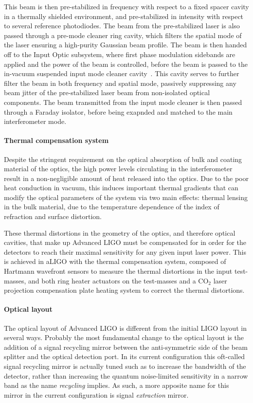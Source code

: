This beam is then pre-stabilized in frequency with respect to a fixed spacer cavity in a thermally shielded environment, and pre-stabilized in intensity with respect to several reference photodiodes. 
The beam from the pre-stabilized laser is also passed through a pre-mode cleaner ring cavity, which filters the spatial mode of the laser ensuring a high-purity Gaussian beam profile. 
The beam is then handed off to the Input Optic subsystem, where first phase modulation sidebands are applied and the power of the beam is controlled, before the beam is passed to the in-vacuum suspended input mode cleaner cavity~\cite{Mueller_2016}. 
This cavity serves to further filter the beam in both frequency and spatial mode, passively suppressing any beam jitter of the pre-stabilized laser beam from non-isolated optical components. 
The beam transmitted from the input mode cleaner is then passed through a Faraday isolator, before being exapnded and matched to the 
main interferometer mode.

\paragraph*{Thermal compensation system}
Despite the stringent requirement on the optical absorption of bulk and coating 
material of the optics, the high power levels circulating in the interferometer result 
in a non-negligible amount of heat released into the optics. Due to the poor heat 
conduction in vacuum, this induces important thermal gradients that can modify 
the optical parameters of the system via two main effects: thermal lensing in the 
bulk material, due to the temperature dependence of the index of refraction  
and surface distortion. 

These thermal distortions in the geometry of the optics, and therefore optical cavities, that make up Advanced LIGO must be compensated for in order for the detectors to reach their maximal sensitivity for any given input laser power. 
This is achieved in aLIGO with the thermal compensation system, composed of Hartmann wavefront sensors to measure the thermal distortions in the input test-masses, and both ring heater actuators on the test-masses and a CO$_2$ laser projection compensation plate heating system to correct the thermal distortions.

\paragraph*{Optical layout}
The optical layout of Advanced LIGO is different from the initial LIGO layout in several ways. 
Probably the most fundamental change to the optical layout is the addition of a signal recycling 
mirror between the anti-symmetric side of the beam splitter and the optical detection port. 
In its current configuration this oft-called signal recycling mirror is actually tuned such as to 
increase the bandwidth of the detector, rather than increasing the quantum noise-limited sensitivity
in a narrow band as the name \emph{recycling} implies. As such, a more apposite name for this mirror 
in the current configuration is signal \emph{extraction} mirror. 

